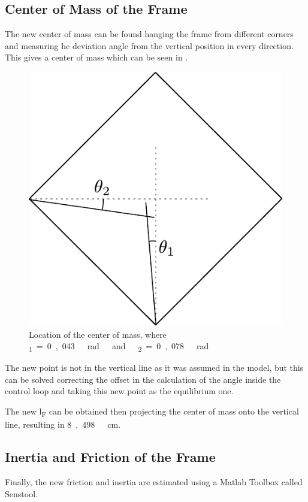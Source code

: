 \subsection{Center of Mass of the Frame}
The new center of mass can be found hanging the frame from different corners and measuring he deviation angle from the vertical position in every direction. This gives a center of mass which can be seen in . 
\begin{figure}[H]
	\centering
	\includegraphics[scale=0.6]{figures/centerOfMassDiagram}
	\caption{Location of the center of mass, where \si{\theta_1=0,043\ rad\ and\ \theta_2=0,078\ rad}}
	\label{centerOfMassDiagram}
\end{figure}


The new point is not in the vertical line as it was assumed in the model, but this can be solved correcting the offset in the calculation of the angle inside the control loop and taking this new point as the equilibrium one. 

The new \si{l_F} can be obtained then projecting the center of mass onto the vertical line, resulting in \si{8,498\ cm}.

\subsection{Inertia and Friction of the Frame}
Finally, the new friction and inertia are estimated using a Matlab Toolbox called Senstool. 

